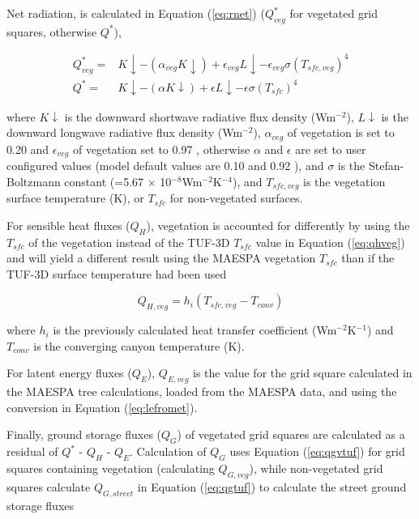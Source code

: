\documentclass[preprint,12pt,authoryear]{elsarticle}
\begin{document}
Net radiation, is calculated in Equation (\ref{eq:rnet}) ($Q^{*}_{veg}$ for vegetated grid squares, otherwise $Q^{*}$), 


\begin{equation}\label{eq:rnet}
\begin{split}
Q^{*}_{veg} =& K\downarrow - (\alpha _{veg} K\downarrow) + \epsilon _{veg} L\downarrow - \epsilon _{veg} \sigma  (T_{sfc,veg}) ^{4} 
\\
Q^{*} =& K\downarrow - (\alpha K\downarrow) + \epsilon L\downarrow - \epsilon \sigma  (T_{sfc}) ^{4} 
\end{split}
\end{equation}

where $K\downarrow$ is the downward shortwave radiative flux density (Wm$^{-2}$), $L\downarrow$ is the downward longwave radiative flux density (Wm$^{-2}$), $\alpha _{veg}$ of vegetation is set to 0.20 and $\epsilon _{veg}$ of vegetation set to 0.97 \citep[p. 12]{Oke1987z}, otherwise $\alpha$ and $\epsilon$ are set to user configured values (model default values are 0.10 and 0.92 \citep{Krayenhoff2007}), and $\sigma$ is the Stefan-Boltzmann constant (=5.67 $\times$ 10$^{-8}$Wm$^{-2}$K$^{-4}$), and $T_{sfc,veg}$ is the vegetation surface temperature (K), or $T_{sfc}$ for non-vegetated surfaces.

For sensible heat fluxes ($Q_{H}$), vegetation is accounted for differently by using the $T_{sfc}$ of the vegetation instead of the TUF-3D $T_{sfc}$ value in Equation (\ref{eq:qhveg}) and will yield a different result using the MAESPA vegetation $T_{sfc}$ than if the TUF-3D surface temperature had been used

\begin{equation}\label{eq:qhveg}
 Q_{H,veg} = h_{i}  (T_{sfc,veg}-T_{conv}) 
\end{equation}

where $h_{i}$ is the previously calculated heat transfer coefficient (Wm$^{-2}$K$^{-1}$) and $T_{conv}$ is the converging canyon temperature (K).

For latent energy fluxes ($Q_{E}$), $Q_{E,veg}$ is the value for the grid square calculated in the MAESPA tree calculations, loaded from the MAESPA data, and using the conversion in Equation (\ref{eq:lefromet}).


Finally, ground storage fluxes ($Q_{G}$) of vegetated grid squares are calculated as a residual of $Q^{*}$ - $Q_{H}$ - $Q_{E}$. Calculation of $Q_{G}$ uses Equation (\ref{eq:qgvtuf}) for grid squares containing vegetation (calculating $Q_{G,veg}$), while non-vegetated grid squares calculate $Q_{G,street}$ in Equation (\ref{eq:qgtuf}) to calculate the street ground storage fluxes
\end{document}
